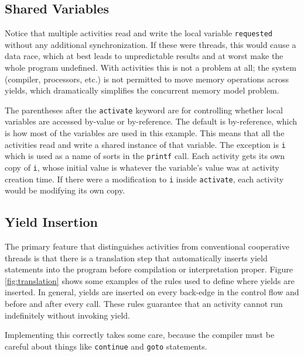 \documentclass[9pt,preprint]{sigplanconf}
\begin{document}

\subsection{Shared Variables}

Notice that multiple activities read and write the local variable \texttt{requested} without any additional synchronization.
If these were threads, this would cause a data race, which at best leads to unpredictable results and at worst make the whole program undefined.
With activities this is not a problem at all; the system (compiler, processors, etc.) is not permitted to move memory operations across yields, which dramatically simplifies the concurrent memory model problem.

The parentheses after the \texttt{activate} keyword are for controlling whether local variables are accessed by-value or by-reference.
The default is by-reference, which is how most of the variables are used in this example.
This means that all the activities read and write a shared instance of that variable.
The exception is \texttt{i} which is used as a name of sorts in the \texttt{printf} call.
Each activity gets its own copy of \texttt{i}, whose initial value is whatever the variable's value was at activity creation time.
If there were a modification to \texttt{i} inside \texttt{activate}, each activity would be modifying its own copy.

\subsection{Yield Insertion}

The primary feature that distinguishes activities from conventional cooperative threads is that there is a translation step that automatically inserts yield statements into the program before compilation or interpretation proper.
Figure \ref{fig:translation} shows some examples of the rules used to define where yields are inserted.
In general, yields are inserted on every back-edge in the control flow and before and after every call.
These rules guarantee that an activity cannot run indefinitely without invoking yield.

Implementing this correctly takes some care, because the compiler must be careful about things like \texttt{continue} and \texttt{goto} statements.
\end{document}
